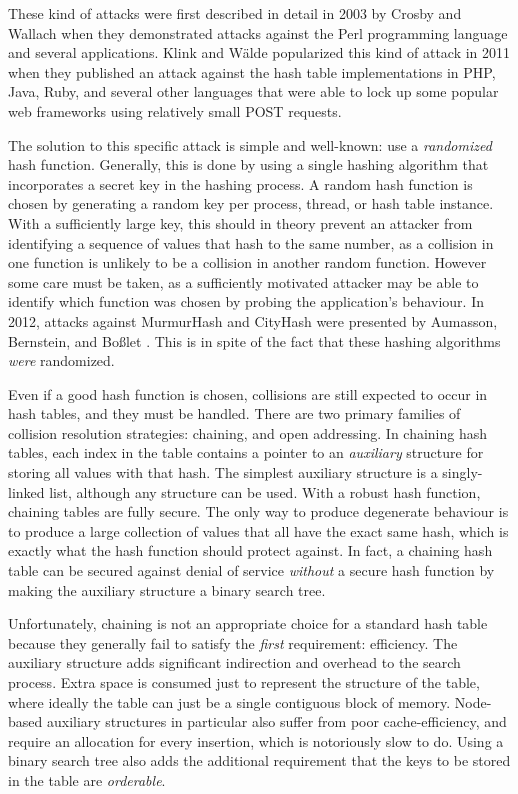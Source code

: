 \documentclass{cccg13}
\begin{document}
These kind of attacks were first described in detail in 2003 by Crosby and
Wallach \cite{perl-dos} when they demonstrated attacks against the Perl
programming language and several applications. Klink and Wälde \cite{web-dos}
popularized this kind of attack in 2011 when they published an attack against
the hash table implementations in PHP, Java, Ruby, and several other languages
that were able to lock up some popular web frameworks using relatively small
POST requests.

The solution to this specific attack is simple and well-known: use a
\emph{randomized} hash function.  Generally, this is done by using a single
hashing algorithm that incorporates a secret key in the hashing process. A
random hash function is chosen by generating a random key per process, thread,
or hash table instance. With a sufficiently large key, this should in theory
prevent an attacker from identifying a sequence of values that hash to the
same number, as a collision in one function is unlikely to be a collision in
another random function. However some care must be taken, as a sufficiently
motivated attacker may be able to identify which function was chosen by
probing the application's behaviour. In 2012, attacks against MurmurHash and
CityHash were presented by Aumasson, Bernstein, and Boßlet \cite{murmur-dos}.
This is in spite of the fact that these hashing algorithms \emph{were}
randomized.

Even if a good hash function is chosen, collisions are still expected to occur
in hash tables, and they must be handled. There are two primary families of
collision resolution strategies: chaining, and open addressing. In chaining
hash tables, each index in the table contains a pointer to an \emph{auxiliary}
structure for storing all values with that hash. The simplest auxiliary
structure is a singly-linked list, although any structure can be used. With a
robust hash function, chaining tables are fully secure. The only way to
produce degenerate behaviour is to produce a large collection of values that
all have the exact same hash, which is exactly what the hash function should
protect against. In fact, a chaining hash table can be secured against denial
of service \emph{without} a secure hash function by making the auxiliary
structure a binary search tree.

Unfortunately, chaining is not an appropriate choice for a standard hash table
because they generally fail to satisfy the \emph{first} requirement:
efficiency. The auxiliary structure adds significant indirection and overhead
to the search process. Extra space is consumed just to represent the structure
of the table, where ideally the table can just be a single contiguous block of
memory. Node-based auxiliary structures in particular also suffer from poor
cache-efficiency, and require an allocation for every insertion, which is
notoriously slow to do. Using a binary search tree also adds the additional
requirement that the keys to be stored in the table are \emph{orderable}.
\end{document}
